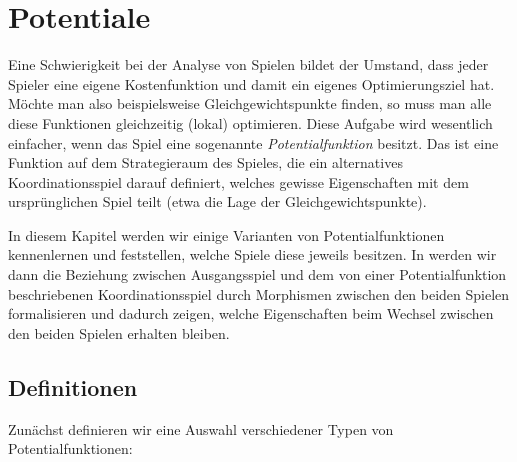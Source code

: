 \section{Potentiale}\label{sec:Potentiale}

Eine Schwierigkeit bei der Analyse von Spielen bildet der Umstand, dass jeder Spieler eine eigene Kostenfunktion und damit ein eigenes Optimierungsziel hat. Möchte man also beispielsweise Gleichgewichtspunkte finden, so muss man alle diese Funktionen gleichzeitig (lokal) optimieren. Diese Aufgabe wird wesentlich einfacher, wenn das Spiel eine sogenannte \emph{Potentialfunktion} besitzt. Das ist eine Funktion auf dem Strategieraum des Spieles, die ein alternatives Koordinationsspiel darauf definiert, welches gewisse Eigenschaften mit dem ursprünglichen Spiel teilt (etwa die Lage der Gleichgewichtspunkte).

In diesem Kapitel werden wir einige Varianten von Potentialfunktionen kennenlernen und feststellen, welche Spiele diese jeweils besitzen. In  werden wir dann die Beziehung zwischen Ausgangsspiel und dem von einer Potentialfunktion beschriebenen Koordinationsspiel durch Morphismen zwischen den beiden Spielen formalisieren und dadurch zeigen, welche Eigenschaften beim Wechsel zwischen den beiden Spielen erhalten bleiben.

\subsection{Definitionen}

Zunächst definieren wir eine Auswahl verschiedener Typen von Potentialfunktionen:


